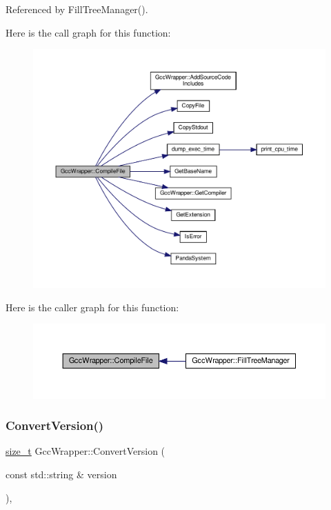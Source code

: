 Referenced by Fill\+Tree\+Manager().

Here is the call graph for this function\+:
\nopagebreak
\begin{figure}[H]
\begin{center}
\leavevmode
\includegraphics[width=350pt]{d4/dbf/classGccWrapper_a8cd41a8c53b37b900efb3363a9612bdc_cgraph}
\end{center}
\end{figure}
Here is the caller graph for this function\+:
\nopagebreak
\begin{figure}[H]
\begin{center}
\leavevmode
\includegraphics[width=350pt]{d4/dbf/classGccWrapper_a8cd41a8c53b37b900efb3363a9612bdc_icgraph}
\end{center}
\end{figure}
\mbox{\label{classGccWrapper_a49f7bc99f88ca39191d6dc27bb658097}} 
\subsubsection{\texorpdfstring{Convert\+Version()}{ConvertVersion()}}
{\footnotesize\ttfamily \hyperlink{tutorial__fpt__2017_2intro_2sixth_2test_8c_a7c94ea6f8948649f8d181ae55911eeaf}{size\+\_\+t} Gcc\+Wrapper\+::\+Convert\+Version (\begin{DoxyParamCaption}\item[{const std\+::string \&}]{version }\end{DoxyParamCaption})\hspace{0.3cm}{\ttfamily [static]}, {\ttfamily [private]}}



